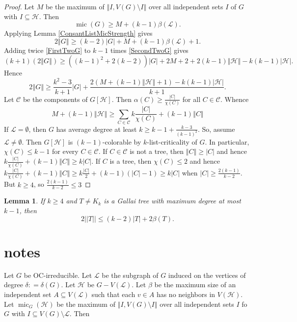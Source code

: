 \documentclass[12pt]{article}
\theoremstyle{plain}
\newtheorem{lem}[thm]{Lemma}
\theoremstyle{definition}
\theoremstyle{remark}
\newcommand{\fancy}[1]{\mathcal{#1}}
\newcommand{\C}[1]{\fancy{C}_{#1}}
\renewcommand{\L}{\fancy{L}}
\newcommand{\HH}{\fancy{H}}
\newcommand{\card}[1]{\left|#1\right|}
\newcommand{\size}[1]{\left\Vert#1\right\Vert}
\newcommand{\DefinedAs}{\mathrel{\mathop:}=}
\newcommand{\mic}{\operatorname{mic}}
\def\C{\fancy{C}}
\begin{document}
\begin{proof}
			Let $M$ be the maximum of $\size{I, V(G) \setminus I}$ over all independent sets $I$ of $G$ with $I \subseteq \HH$. Then
			\begin{equation*}
				\mic(G) \ge M + (k-1)\beta(\L).
			\end{equation*}
			Applying Lemma \ref{ConsantListMicStrength} gives
			\begin{equation}
			2\size{G} \ge (k-2)\card{G} + M + (k-1)\beta(\L) + 1.
			\label{SecondTwoG}
			\end{equation}				
			Adding twice \ref{FirstTwoG} to $k-1$ times \ref{SecondTwoG} gives
			\begin{equation*}
				(k+1)(2\size{G}) \ge ((k-1)^2 + 2(k-2))\card{G} + 2M + 2 + 2(k-1)\size{\HH} - k(k-1)\card{\HH}.
			\end{equation*}
			Hence
			\begin{equation}
			2\size{G} \ge \frac{k^2 - 3}{k+1}\card{G} + \frac{2(M + (k-1)\size{\HH} + 1) - k(k-1)\card{\HH}}{k+1}.
			\label{BigOne}
			\end{equation}
			Let $\C$ be the components of $G[\HH]$.  Then $\alpha(C) \ge \frac{\card{C}}{\chi(C)}$ for all $C \in \C$.  Whence
			\begin{equation}
			  M + (k-1)\size{\HH} \ge \sum_{C \in \C} k\frac{\card{C}}{\chi(C)} + (k-1)\size{C}
			  \label{Mbound}
			\end{equation}
			If $\L = \emptyset$, then $G$ has average degree at least $k \ge k-1 + \frac{k-3}{(k-1)^2}$.  So, assume $\L \ne \emptyset$.  Then $G[\HH]$ is $(k-1)$-colorable by $k$-list-criticality of $G$.  
			In particular, $\chi(C) \le k-1$ for every $C \in \C$.  If $C \in \C$ is not a tree, then $\size{C} \ge \card{C}$ and hence $k\frac{\card{C}}{\chi(C)} + (k-1)\size{C} \ge k\card{C}$.  If $C$ is a tree, then $\chi(C) \le 2$ and hence 
			$k\frac{\card{C}}{\chi(C)} + (k-1)\size{C} \ge k\frac{\card{C}}{2} + (k-1)(\card{C} - 1) \ge k\card{C}$ when $\card{C} \ge \frac{2(k-1)}{k-2}$.  But $k \ge 4$, so $\frac{2(k-1)}{k-2} \le 3$
			
\end{proof}

\begin{lem}\label{SimpleGallaiBetaBound}
	If $k \ge 4$ and $T \ne K_k$ is a Gallai tree with maximum degree at most $k-1$, then
	\[2||T|| \le (k-2)|T| + 2\beta(T).\]
\end{lem}

\section{notes}
Let $G$ be OC-irreducible.  Let $\L$ be the subgraph of $G$ induced on the vertices of degree $\delta \DefinedAs \delta(G)$. Let $\HH$ be $G - V(\L)$.  Let $\beta$ be the maximum size of an independent set $A \subseteq V(\L)$ such that each $v \in A$ has no neighbors in $V(\HH)$.  Let $\mic_G(\HH)$ be the maximum of $\size{I, V(G) \setminus I}$ over all independent sets $I$ fo $G$ with $I \subseteq V(G) \setminus \L$.  Then
\end{document}

